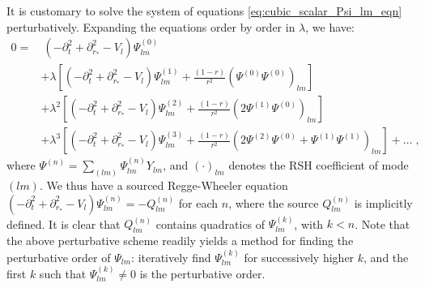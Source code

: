 \documentclass[reprint,aps,physrev,superscriptaddress,10pt,notitlepage,prd,nofootinbib,onecolumn]{revtex4-2}
\begin{document}
It is customary to solve the system of equations \eqref{eq:cubic_scalar_Psi_lm_eqn} perturbatively.
Expanding the equations order by order in $\lambda$, we have:
\begin{align}
  0 =& \  (-\partial_t^2 +  \partial_{r_*}^2 - V_l) \Psi_{lm}^{(0)} \nonumber \\
        & +  \lambda \left[(-\partial_t^2 +  \partial_{r_*}^2 - V_l) \Psi_{lm}^{(1)} + \frac{(1-r)}{r^2} \left(\Psi^{(0)} \Psi^{(0)}\right)_{lm} \right] \nonumber \\
        & +  \lambda^2 \left[(-\partial_t^2 +  \partial_{r_*}^2 - V_l) \Psi_{lm}^{(2)} + \frac{(1-r)}{r^2} \left(2 \Psi^{(1)} \Psi^{(0)}\right)_{lm} \right] \nonumber \\
        & +  \lambda^3 \left[(-\partial_t^2 +  \partial_{r_*}^2 - V_l) \Psi_{lm}^{(3)} + \frac{(1-r)}{r^2} \left(2 \Psi^{(2)} \Psi^{(0)} + \Psi^{(1)} \Psi^{(1)}\right)_{lm} \right]
          + \hdots \;,
\end{align}
where $\Psi^{(n)} = \sum_{(lm)} \Psi_{lm}^{(n)} Y_{lm}$, and $(\cdot)_{lm}$ denotes the RSH coefficient of mode $(lm)$.
We thus have a sourced Regge-Wheeler equation $(-\partial_t^2 +  \partial_{r_*}^2 - V_l) \Psi_{lm}^{(n)}  = -Q_{lm}^{(n)}$ for each $n$, where the source $Q_{lm}^{(n)}$ is implicitly defined.
It is clear that $Q_{lm}^{(n)}$ contains quadratics of $\Psi_{lm}^{(k)}$, with $k < n$.
Note that the above perturbative scheme readily yields a method for finding the perturbative order of $\Psi_{lm}$: iteratively find $\Psi_{lm}^{(k)}$ for successively higher $k$, and the first $k$ such that $\Psi_{lm}^{(k)} \neq 0$ is the perturbative order.
\end{document}
